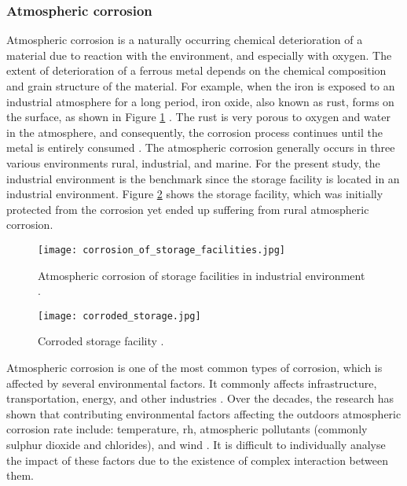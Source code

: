 \subsubsection{Atmospheric corrosion}
Atmospheric corrosion is a naturally occurring chemical deterioration of a material due to reaction with the environment, and especially with oxygen. The extent of deterioration of a ferrous metal depends on the chemical composition and grain structure of the material. For example, when the iron is exposed to an industrial atmosphere for a long period, iron oxide, also known as rust, forms on the surface, as shown in Figure \ref{ch3:figure:corrosion} \cite{mcarthur2004engineering}. The rust is very porous to oxygen and water in the atmosphere, and consequently, the corrosion process continues until the metal is entirely consumed \cite{protopopoff2011surface}.  The atmospheric corrosion generally occurs in three various environments rural, industrial, and marine. For the present study, the industrial environment is the benchmark since the storage facility is located in an industrial environment. Figure \ref{ch3:figure:corroded} shows the storage facility, which was initially protected from the corrosion yet ended up suffering from rural atmospheric corrosion.

\begin{figure}[H]
    \centering
    \texttt{[image: corrosion\_of\_storage\_facilities.jpg]}
    \caption{Atmospheric corrosion of storage facilities in industrial environment \cite{chigondo2016recent}.}
    \label{ch3:figure:corrosion}
\end{figure}
 
\begin{figure}[H]
    \centering
    \texttt{[image: corroded\_storage.jpg]}
    \caption{Corroded storage facility \cite{protopopoff2011surface}.}
    \label{ch3:figure:corroded}
\end{figure}

Atmospheric corrosion is one of the most common types of corrosion, which is affected by several environmental factors. It commonly affects infrastructure, transportation, energy, and other industries \cite{pei2021understanding}. Over the decades, the research has shown that contributing environmental factors affecting the outdoors atmospheric corrosion rate include: temperature, \acrfull{rh}, atmospheric pollutants (commonly sulphur dioxide and chlorides), and wind \cite{abou2001mechanical, islam2018effects}. It is difficult to individually analyse the impact of these factors due to the existence of complex interaction between them.

